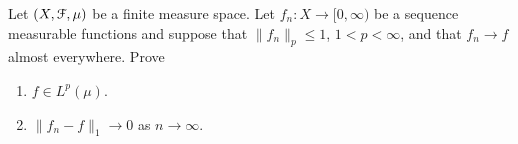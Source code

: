 \begin{problem}
  Let $(X,\mathcal{F},\mu)$ be a finite measure space. Let
  $f_n\colon X\to[0,\infty)$ be a sequence measurable functions and suppose
  that $\|f_n\|_p\leq 1$, $1<p<\infty$, and that $f_n\to f$ almost
  everywhere. Prove
  \begin{enumerate}[label=(\roman*),noitemsep]
  \item $f\in L^p(\mu)$.
  \item $\|f_n-f\|_1\to 0$ as $n\to\infty$.
  \end{enumerate}
\end{problem}
\begin{solution}

\end{solution}

\begin{problem}
\end{problem}
\begin{solution}
\end{solution}

\begin{problem}
\end{problem}
\begin{solution}
\end{solution}

